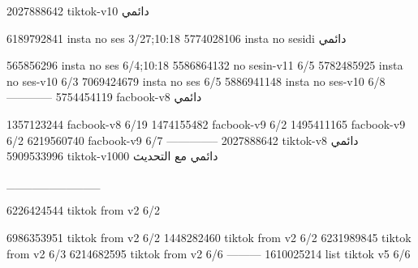 2027888642 tiktok-v10
دائمي

6189792841 insta no ses
3/27;10:18
5774028106 insta no sesidi
دائمي

565856296 insta no ses
6/4;10:18
5586864132 no sesin-v11
6/5
5782485925 insta no ses-v10
6/3
7069424679 insta no ses
6/5
5886941148 insta no ses-v10
6/8
------------
5754454119 facbook-v8
دائمي

1357123244 facbook-v8
6/19
1474155482 facbook-v9
6/2
1495411165 facbook-v9
6/2
6219560740 facbook-v9
6/7
--------------
2027888642 tiktok-v8
دائمي
5909533996 tiktok-v1000
دائمي مع التحديث

___________

6226424544 tiktok from v2
6/2

6986353951 tiktok from v2
6/2
1448282460 tiktok from v2
6/2
6231989845 tiktok from v2
6/3
6214682595 tiktok from v2
6/6
---------
1610025214 list tiktok v5
6/6
